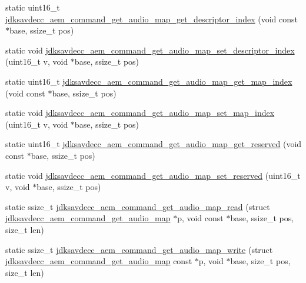 \begin{DoxyCompactItemize}
\item 
static uint16\+\_\+t \hyperlink{group__command__get__audio__map_ga06ae150bd8b86ff7a6a1631109268b74}{jdksavdecc\+\_\+aem\+\_\+command\+\_\+get\+\_\+audio\+\_\+map\+\_\+get\+\_\+descriptor\+\_\+index} (void const $\ast$base, ssize\+\_\+t pos)
\item 
static void \hyperlink{group__command__get__audio__map_ga1dd1cec26d480eb23b493c556c965453}{jdksavdecc\+\_\+aem\+\_\+command\+\_\+get\+\_\+audio\+\_\+map\+\_\+set\+\_\+descriptor\+\_\+index} (uint16\+\_\+t v, void $\ast$base, ssize\+\_\+t pos)
\item 
static uint16\+\_\+t \hyperlink{group__command__get__audio__map_gafc8b0ebee92d51701a067ebd8a256bc9}{jdksavdecc\+\_\+aem\+\_\+command\+\_\+get\+\_\+audio\+\_\+map\+\_\+get\+\_\+map\+\_\+index} (void const $\ast$base, ssize\+\_\+t pos)
\item 
static void \hyperlink{group__command__get__audio__map_gad3571c1e24e1f73fd254bdf7d9b2c612}{jdksavdecc\+\_\+aem\+\_\+command\+\_\+get\+\_\+audio\+\_\+map\+\_\+set\+\_\+map\+\_\+index} (uint16\+\_\+t v, void $\ast$base, ssize\+\_\+t pos)
\item 
static uint16\+\_\+t \hyperlink{group__command__get__audio__map_ga5defb4e97af660a3779691fb394291dd}{jdksavdecc\+\_\+aem\+\_\+command\+\_\+get\+\_\+audio\+\_\+map\+\_\+get\+\_\+reserved} (void const $\ast$base, ssize\+\_\+t pos)
\item 
static void \hyperlink{group__command__get__audio__map_gaf5c8446ce767cfb0f9f7cad34c460d32}{jdksavdecc\+\_\+aem\+\_\+command\+\_\+get\+\_\+audio\+\_\+map\+\_\+set\+\_\+reserved} (uint16\+\_\+t v, void $\ast$base, ssize\+\_\+t pos)
\item 
static ssize\+\_\+t \hyperlink{group__command__get__audio__map_gaa38ab962efec97f7f07e13dd9494d8cc}{jdksavdecc\+\_\+aem\+\_\+command\+\_\+get\+\_\+audio\+\_\+map\+\_\+read} (struct \hyperlink{structjdksavdecc__aem__command__get__audio__map}{jdksavdecc\+\_\+aem\+\_\+command\+\_\+get\+\_\+audio\+\_\+map} $\ast$p, void const $\ast$base, ssize\+\_\+t pos, size\+\_\+t len)
\item 
static ssize\+\_\+t \hyperlink{group__command__get__audio__map_gab104d4a38d80dcee98d130f0c1f7a9b8}{jdksavdecc\+\_\+aem\+\_\+command\+\_\+get\+\_\+audio\+\_\+map\+\_\+write} (struct \hyperlink{structjdksavdecc__aem__command__get__audio__map}{jdksavdecc\+\_\+aem\+\_\+command\+\_\+get\+\_\+audio\+\_\+map} const $\ast$p, void $\ast$base, size\+\_\+t pos, size\+\_\+t len)
\end{DoxyCompactItemize}


